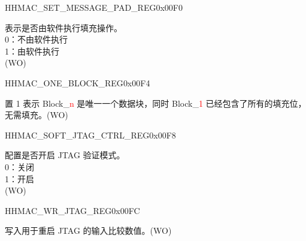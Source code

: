 \begin{register}{H}{HMAC\_SET\_MESSAGE\_PAD\_REG}{0x00F0}\label{regdesc:HMACSETMESSAGEPADREG}
%
%
\regnewline%
\begin{regdesc}\begin{reglist}
\label{fielddesc:HMACSETTEXTPAD}\item [HMAC\_SET\_TEXT\_PAD] 表示是否由软件执行填充操作。
\\0：不由软件执行
\\1：由软件执行
\\(WO)
\end{reglist}\end{regdesc}
\end{register}


\begin{register}{H}{HMAC\_ONE\_BLOCK\_REG}{0x00F4}\label{regdesc:HMACONEBLOCKREG}
%
%
\regnewline%
\begin{regdesc}\begin{reglist}
\label{fielddesc:HMACSETONEBLOCK}\item [HMAC\_SET\_ONE\_BLOCK] 置 1 表示 Block\_\textcolor{red}{n} 是唯一一个数据块，同时 Block\_\textcolor{red}{1} 已经包含了所有的填充位，无需填充。(WO)
\end{reglist}\end{regdesc}
\end{register}


\begin{register}{H}{HMAC\_SOFT\_JTAG\_CTRL\_REG}{0x00F8}\label{regdesc:HMACSOFTJTAGCTRLREG}
%
%
\regnewline%
\begin{regdesc}\begin{reglist}
\label{fielddesc:HMACSOFTJTAGCTRL}\item [HMAC\_SOFT\_JTAG\_CTRL] 配置是否开启 JTAG 验证模式。
\\0：关闭
\\1：开启
\\(WO)
\end{reglist}\end{regdesc}
\end{register}


\begin{register}{H}{HMAC\_WR\_JTAG\_REG}{0x00FC}\label{regdesc:HMACWRJTAGREG}
%
\regnewline%
\begin{regdesc}\begin{reglist}
\label{fielddesc:HMACWRJTAG}\item [HMAC\_WR\_JTAG] 写入用于重启 JTAG 的输入比较数值。(WO)
\end{reglist}\end{regdesc}
\end{register}



